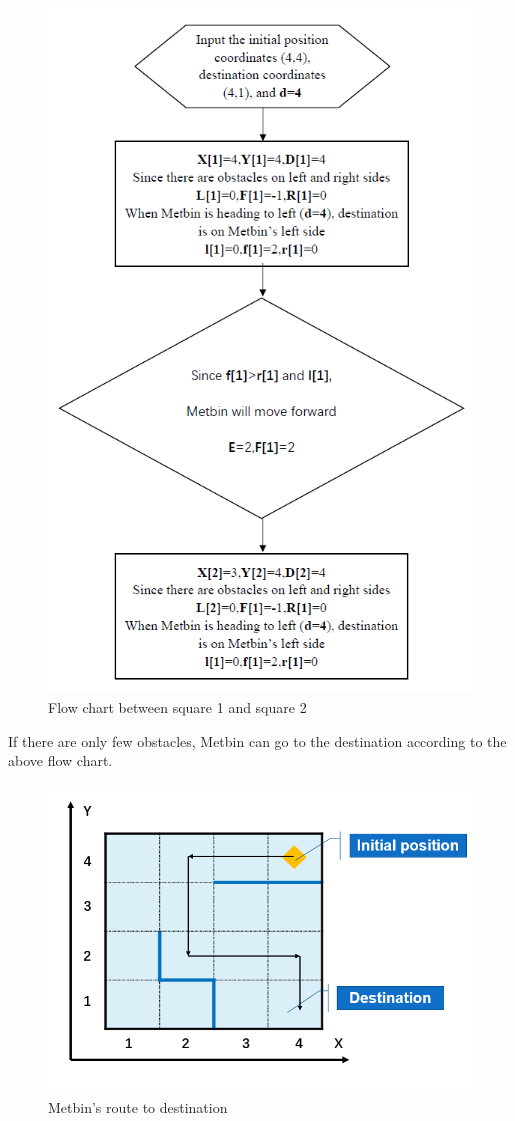 \documentclass[12pt]{article}
\begin{document}
\begin{figure}[H]
\centering
\includegraphics[scale=0.5]{P4.jpg}
\caption{Flow chart between square 1 and square 2}
\end{figure}
If there are only few obstacles, Metbin can go to the destination according to the above flow chart.
\begin{figure}[H]
\centering
\includegraphics[scale=0.5]{P5.jpg}
\caption{Metbin's route to destination}
\end{figure}
\end{document}

